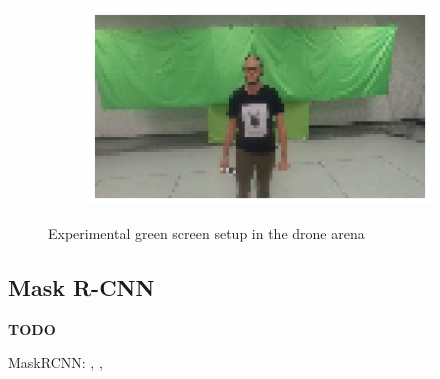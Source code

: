 \begin{figure}[!h]
\begin{center}
\begin{subfigure}[h]{0.24\textwidth}
		\end{subfigure}
		\hfill
		\begin{subfigure}[h]{0.24\textwidth}
			\centering
			\includegraphics[width=1\textwidth]{"contents/images/04-greenscreen-4"}
		\end{subfigure}
	\end{center}
	\vspace{-0.5cm}
	\caption[Experimental green screen setup in the drone arena]{Experimental green screen setup in the drone arena}
	\label{fig:greenscreen}
\end{figure}



\subsection{Mask R-CNN}
\label{subsec:sota-maskrcnn}

\textbf{TODO}

MaskRCNN: \cite{he2018mask}, \cite{maskrcnn_explanation}, \cite{maskrcnn_arcgis}





